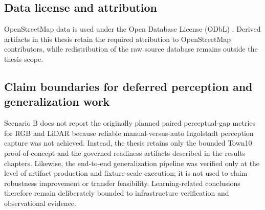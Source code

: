 \subsection{Data license and attribution}
\label{sec:osm_license}
OpenStreetMap data is used under the Open Database License (ODbL) \cite{osm_copyright,osm_attribution_guidelines}. Derived artifacts in this thesis retain the required attribution to OpenStreetMap contributors, while redistribution of the raw source database remains outside the thesis scope.

\subsection{Claim boundaries for deferred perception and generalization work}
\label{sec:perceptual_metrics_deferred}
Scenario B does not report the originally planned paired perceptual-gap metrics for RGB and LiDAR because reliable manual-versus-auto Ingolstadt perception capture was not achieved. Instead, the thesis retains only the bounded Town10 proof-of-concept and the governed readiness artifacts described in the results chapters. Likewise, the end-to-end generalization pipeline was verified only at the level of artifact production and fixture-scale execution; it is not used to claim robustness improvement or transfer feasibility. Learning-related conclusions therefore remain deliberately bounded to infrastructure verification and observational evidence.
